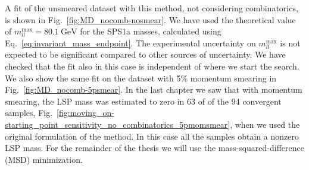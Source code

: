 \documentclass[twoside,english]{uiofysmaster}
\begin{document}
A fit of the unsmeared dataset with this method, not considering combinatorics, is shown in Fig.\ \ref{fig:MD_nocomb-nosmear}. We have used the theoretical value of $m_{ll}^\mathrm{max} = 80.1~\mathrm{GeV}$ for the SPS1a masses, calculated using Eq.\ \eqref{eq:invariant_mass_endpoint}. The experimental uncertainty on $m_{ll}^\mathrm{max}$ is not expected to be significant compared to other sources of uncertainty. We have checked that the fit also in this case is independent of where we start the search. We also show the same fit on the dataset with 5\% momentum smearing in Fig.\ \ref{fig:MD_nocomb-5psmear}. In the last chapter we saw that with momentum smearing, the LSP mass was estimated to zero in 63 of of the 94 convergent samples, Fig.\ \ref{fig:moving_on-starting_point_sensitivity_no_combinatorics_5pmomsmear}, when we used the original formulation of the method. In this case all the samples obtain a nonzero LSP mass. For the remainder of the thesis we will use the mass-squared-difference (MSD) minimization.
\end{document}
